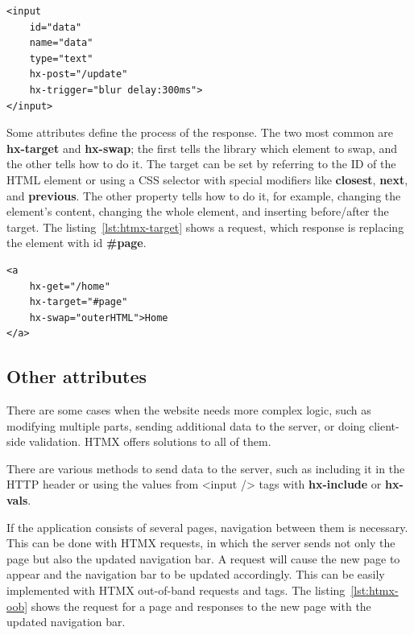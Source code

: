 \begin{lstlisting}[caption=Custom HTMX trigger,label=lst:htmx-trigger, float]
<input 
	id="data"
	name="data"
	type="text"
	hx-post="/update"
	hx-trigger="blur delay:300ms">
</input>
\end{lstlisting}

Some attributes define the process of the response. The two most common are \textbf{hx-target} and \textbf{hx-swap}; the first tells the library which element to swap, and the other tells how to do it. The target can be set by referring to the ID of the HTML element or using a CSS selector with special modifiers like \textbf{closest}, \textbf{next}, and \textbf{previous}. The other property tells how to do it, for example, changing the element's content, changing the whole element, and inserting before/after the target. The listing~\ref{lst:htmx-target} shows a request, which response is replacing the element with id \textbf{\#page}.

\begin{lstlisting}[caption=Setting HTMX target,label=lst:htmx-target, float]
<a 
	hx-get="/home"
	hx-target="#page"
	hx-swap="outerHTML">Home
</a>
\end{lstlisting}

\subsection{Other attributes}
There are some cases when the website needs more complex logic, such as modifying multiple parts, sending additional data to the server, or doing client-side validation. HTMX offers solutions to all of them.

There are various methods to send data to the server, such as including it in the HTTP header or using the values from <input /> tags with \textbf{hx-include} or \textbf{hx-vals}.

If the application consists of several pages, navigation between them is necessary. This can be done with HTMX requests, in which the server sends not only the page but also the updated navigation bar. A request will cause the new page to appear and the navigation bar to be updated accordingly. This can be easily implemented with HTMX out-of-band requests and tags. The listing~\ref{lst:htmx-oob} shows the request for a page and responses to the new page with the updated navigation bar.

